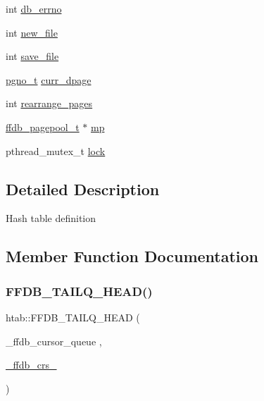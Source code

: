 \begin{DoxyCompactItemize}
int \mbox{\hyperlink{structhtab_a27cb940c79df2d115593e71ab05a0643}{db\+\_\+errno}}
\item 
int \mbox{\hyperlink{structhtab_ac52b8a6b13ecefc3a22bc34cc6086765}{new\+\_\+file}}
\item 
int \mbox{\hyperlink{structhtab_ae130587a915749306b8f12b54c592545}{save\+\_\+file}}
\item 
\mbox{\hyperlink{adat-devel_2other__libs_2filedb_2filehash_2ffdb__db_8h_a000813331643d38481142bcce7de1501}{pgno\+\_\+t}} \mbox{\hyperlink{structhtab_ab19afd3577916a17ccb184cbefe45629}{curr\+\_\+dpage}}
\item 
int \mbox{\hyperlink{structhtab_af3b2be98fadf5037c0b44dedc5c2c08d}{rearrange\+\_\+pages}}
\item 
\mbox{\hyperlink{adat-devel_2other__libs_2filedb_2filehash_2ffdb__pagepool_8h_a73290f737b0e5f8be90a0fa96ddf6ab6}{ffdb\+\_\+pagepool\+\_\+t}} $\ast$ \mbox{\hyperlink{structhtab_a414fc5f3e4460bddfaae9f47613ae768}{mp}}
\item 
pthread\+\_\+mutex\+\_\+t \mbox{\hyperlink{structhtab_a74c24a124724588e43ed76d6dea81b74}{lock}}
\end{DoxyCompactItemize}


\subsection{Detailed Description}
Hash table definition 

\subsection{Member Function Documentation}
\mbox{\label{structhtab_af19d4f4f4be39bcc1bca0509bef5c3cf}} 
\subsubsection{\texorpdfstring{FFDB\_TAILQ\_HEAD()}{FFDB\_TAILQ\_HEAD()}\hspace{0.1cm}{\footnotesize\ttfamily [1/2]}}
{\footnotesize\ttfamily htab\+::\+F\+F\+D\+B\+\_\+\+T\+A\+I\+L\+Q\+\_\+\+H\+E\+AD (\begin{DoxyParamCaption}\item[{\+\_\+ffdb\+\_\+cursor\+\_\+queue}]{,  }\item[{\mbox{\hyperlink{struct__ffdb__crs__}{\+\_\+ffdb\+\_\+crs\+\_\+}}}]{ }\end{DoxyParamCaption})}

